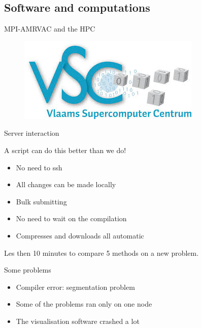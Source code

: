\subsection{Software and computations}

\begin{frame}{MPI-AMRVAC and the HPC}


\begin{figure}
\centering
\includegraphics[width=0.7\linewidth]{../../figs/vsc}
\label{fig:vsc}
\end{figure}

\end{frame}


\begin{frame}{Server interaction}

A script can do this better than we do!

\begin{itemize}
\item No need to ssh
\item All changes can be made locally 
\item Bulk submitting
\item No need to wait on the compilation
\item Compresses and downloads all automatic
\end{itemize}

Les then 10 minutes to compare 5 methods on a new problem.
\end{frame}

\begin{frame}{Some problems}
\vspace{2cm}
\begin{itemize}
\item Compiler error: segmentation problem
\item Some of the problems ran only on one node 
\item The visualisation software crashed a lot
\end{itemize}

\end{frame}